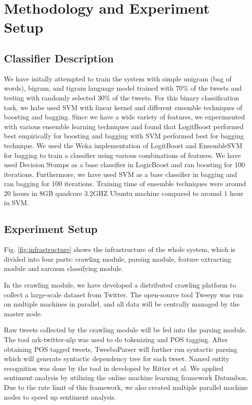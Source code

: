 \section{Methodology and Experiment Setup}
\label{sec:methodology}
\subsection{Classifier Description}
We have initally attempted to train the system with simple unigram (bag of words), bigram, and tigram language model trained with $70\%$ of the tweets and testing with randomly selected $30\%$ of the tweets. For this binary classification task, we habe used SVM \cite{libsvm} with linear kernel and different ensemble techniques of boosting and bagging. Since we have a wide variety of features, we experimented with various ensemble learning techniques and found that LogitBoost performed best
empirically for boosting and bagging with SVM performed best for bagging technique. We used the Weka implementation of LogitBoost \cite{Friedman98} and EnsembleSVM for bagging \cite{ensembleSVM} to train a classifier using various combinations of features. We have used Decision Stumps as a base classifier in LogicBoost and ran boosting for 100 iterations. Furthermore, 
we have used SVM as a base classifier in bagging and ran bagging for 100 iterations. Training time of ensemble techniques were around $20$ hours in 8GB quadcore 3.2GHZ Ubuntu machine compared to around $1$ hour in SVM.

\subsection{Experiment Setup}

Fig. \ref{fig:infrastructure} shows the infrastructure of the whole system, which is divided into four parts: crawling module, parsing module, feature extracting module and sarcasm classifying module.

In the crawling module, we have developed a distributed crawling platform to collect a large-scale dataset from Twitter. The open-source tool Tweepy\cite{tweepy} was run on multiple machines in parallel, and all data will be centrally managed by the master node.

Raw tweets collected by the crawling module will be fed into the parsing module. The tool ark-twitter-nlp\cite{tweetnlp} was used to do tokenizing and POS tagging. After obtaining POS tagged tweets, TweeboParser\cite{kong2014dependency} will further run syntactic parsing which will generate syntactic dependency tree for each tweet. Named entity recognition was done by the tool in developed by Ritter et al\cite{Ritter11}\cite{Ritter12}. We applied sentiment analysis by utilizing the online machine learning framework Datumbox\cite{datumbox}. Due to the rate limit of this framework, we also created multiple parallel machine nodes to speed up sentiment analysis.

